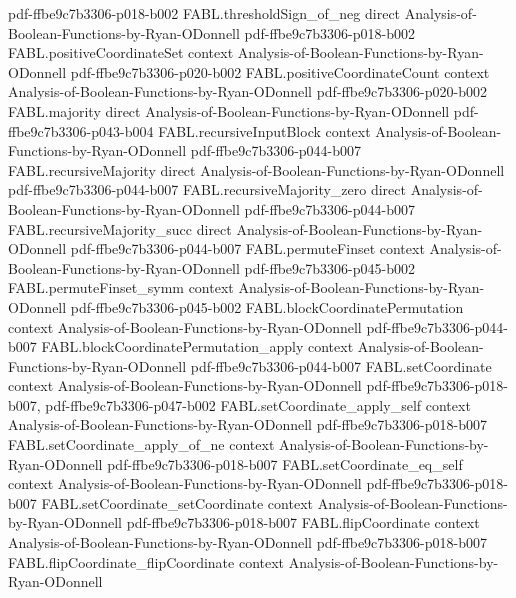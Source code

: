 \begin{theorem}
  {pdf-ffbe9c7b3306-p018-b002}
\proofstep
  {FABL.thresholdSign_of_neg}
  {direct}
  {Analysis-of-Boolean-Functions-by-Ryan-ODonnell}
  {pdf-ffbe9c7b3306-p018-b002}
\proofstep
  {FABL.positiveCoordinateSet}
  {context}
  {Analysis-of-Boolean-Functions-by-Ryan-ODonnell}
  {pdf-ffbe9c7b3306-p020-b002}
\proofstep
  {FABL.positiveCoordinateCount}
  {context}
  {Analysis-of-Boolean-Functions-by-Ryan-ODonnell}
  {pdf-ffbe9c7b3306-p020-b002}
\proofstep
  {FABL.majority}
  {direct}
  {Analysis-of-Boolean-Functions-by-Ryan-ODonnell}
  {pdf-ffbe9c7b3306-p043-b004}
\proofstep
  {FABL.recursiveInputBlock}
  {context}
  {Analysis-of-Boolean-Functions-by-Ryan-ODonnell}
  {pdf-ffbe9c7b3306-p044-b007}
\proofstep
  {FABL.recursiveMajority}
  {direct}
  {Analysis-of-Boolean-Functions-by-Ryan-ODonnell}
  {pdf-ffbe9c7b3306-p044-b007}
\proofstep
  {FABL.recursiveMajority_zero}
  {direct}
  {Analysis-of-Boolean-Functions-by-Ryan-ODonnell}
  {pdf-ffbe9c7b3306-p044-b007}
\proofstep
  {FABL.recursiveMajority_succ}
  {direct}
  {Analysis-of-Boolean-Functions-by-Ryan-ODonnell}
  {pdf-ffbe9c7b3306-p044-b007}
\proofstep
  {FABL.permuteFinset}
  {context}
  {Analysis-of-Boolean-Functions-by-Ryan-ODonnell}
  {pdf-ffbe9c7b3306-p045-b002}
\proofstep
  {FABL.permuteFinset_symm}
  {context}
  {Analysis-of-Boolean-Functions-by-Ryan-ODonnell}
  {pdf-ffbe9c7b3306-p045-b002}
\proofstep
  {FABL.blockCoordinatePermutation}
  {context}
  {Analysis-of-Boolean-Functions-by-Ryan-ODonnell}
  {pdf-ffbe9c7b3306-p044-b007}
\proofstep
  {FABL.blockCoordinatePermutation_apply}
  {context}
  {Analysis-of-Boolean-Functions-by-Ryan-ODonnell}
  {pdf-ffbe9c7b3306-p044-b007}
\proofstep
  {FABL.setCoordinate}
  {context}
  {Analysis-of-Boolean-Functions-by-Ryan-ODonnell}
  {pdf-ffbe9c7b3306-p018-b007,
    pdf-ffbe9c7b3306-p047-b002}
\proofstep
  {FABL.setCoordinate_apply_self}
  {context}
  {Analysis-of-Boolean-Functions-by-Ryan-ODonnell}
  {pdf-ffbe9c7b3306-p018-b007}
\proofstep
  {FABL.setCoordinate_apply_of_ne}
  {context}
  {Analysis-of-Boolean-Functions-by-Ryan-ODonnell}
  {pdf-ffbe9c7b3306-p018-b007}
\proofstep
  {FABL.setCoordinate_eq_self}
  {context}
  {Analysis-of-Boolean-Functions-by-Ryan-ODonnell}
  {pdf-ffbe9c7b3306-p018-b007}
\proofstep
  {FABL.setCoordinate_setCoordinate}
  {context}
  {Analysis-of-Boolean-Functions-by-Ryan-ODonnell}
  {pdf-ffbe9c7b3306-p018-b007}
\proofstep
  {FABL.flipCoordinate}
  {context}
  {Analysis-of-Boolean-Functions-by-Ryan-ODonnell}
  {pdf-ffbe9c7b3306-p018-b007}
\proofstep
  {FABL.flipCoordinate_flipCoordinate}
  {context}
  {Analysis-of-Boolean-Functions-by-Ryan-ODonnell}

\end{theorem}
